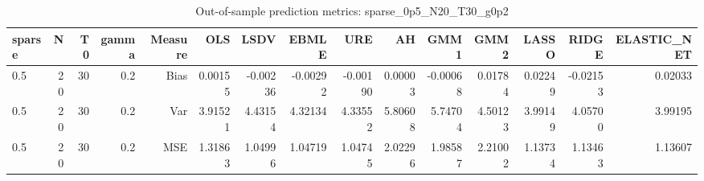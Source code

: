 \begin{table}[!htbp]\centering
\caption{Out-of-sample prediction metrics: sparse_0p5_N20_T30_g0p2}
\label{tab:table3_sparse_0p5_N20_T30_g0p2}
\begin{tabular}{lrrrrrrrrrrrrrr}
\hline
sparse & N & T0 & gamma & Measure & OLS & LSDV & EBMLE & URE & AH & GMM1 & GMM2 & LASSO & RIDGE & ELASTIC_NET \\
\hline
0.5 & 20 & 30 & 0.2 & Bias & 0.00155 & -0.00236 & -0.00292 & -0.00190 & 0.00003 & -0.00068 & 0.01784 & 0.02249 & -0.02153 & 0.02033 \\
0.5 & 20 & 30 & 0.2 & Var & 3.91521 & 4.43154 & 4.32134 & 4.33552 & 5.80608 & 5.74704 & 4.50123 & 3.99149 & 4.05700 & 3.99195 \\
0.5 & 20 & 30 & 0.2 & MSE & 1.31863 & 1.04996 & 1.04719 & 1.04745 & 2.02296 & 1.98587 & 2.21002 & 1.13734 & 1.13463 & 1.13607 \\
\hline
\end{tabular}
\end{table}

